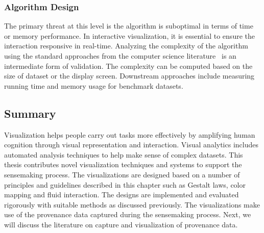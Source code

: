 \subsubsection{Algorithm Design}
The primary threat at this level is the algorithm is suboptimal in terms of time or memory performance. In interactive visualization, it is essential to ensure the interaction responsive in real-time. Analyzing the complexity of the algorithm using the standard approaches from the computer science literature~\cite{Cormen2009} is an intermediate form of validation. The complexity can be computed based on the size of dataset or the display screen. Downstream approaches include measuring running time and memory usage for benchmark datasets.


\subsection{Summary}
Visualization helps people carry out tasks more effectively by amplifying human cognition through visual representation and interaction. Visual analytics includes automated analysis techniques to help make sense of complex datasets. This thesis contributes novel visualization techniques and systems to support the sensemaking process. The visualizations are designed based on a number of principles and guidelines described in this chapter such as Gestalt laws, color mapping and fluid interaction. The designs are implemented and evaluated rigorously with suitable methods as discussed previously. The visualizations make use of the provenance data captured during the sensemaking process. Next, we will discuss the literature on capture and visualization of provenance data.